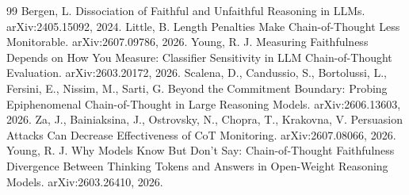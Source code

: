 \documentclass{article}
\begin{document}
\begin{thebibliography}{99}
Bergen, L. Dissociation of Faithful and Unfaithful Reasoning in LLMs.
arXiv:2405.15092, 2024.
 Little, B. Length Penalties Make Chain-of-Thought
Less Monitorable. arXiv:2607.09786, 2026.
 Young, R. J. Measuring Faithfulness Depends on
How You Measure: Classifier Sensitivity in LLM Chain-of-Thought Evaluation.
arXiv:2603.20172, 2026.
 Scalena, D., Candussio, S., Bortolussi, L.,
Fersini, E., Nissim, M., Sarti, G. Beyond the Commitment Boundary: Probing
Epiphenomenal Chain-of-Thought in Large Reasoning Models. arXiv:2606.13603,
2026.
 Za, J., Bainiaksina, J., Ostrovsky, N., Chopra, T.,
Krakovna, V. Persuasion Attacks Can Decrease Effectiveness of CoT
Monitoring. arXiv:2607.08066, 2026.
 Young, R. J. Why Models Know But Don't Say:
Chain-of-Thought Faithfulness Divergence Between Thinking Tokens and Answers
in Open-Weight Reasoning Models. arXiv:2603.26410, 2026.
\end{thebibliography}
\end{document}
